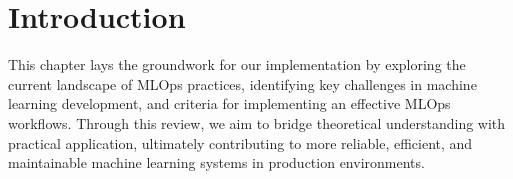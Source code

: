 \section{Introduction}\label{sec:stintro}

This chapter lays the groundwork for our implementation by exploring the current landscape of MLOps practices, identifying key challenges in machine learning development, and criteria for implementing an effective MLOps workflows.
Through this review, we aim to bridge theoretical understanding with practical application, ultimately contributing to more reliable, efficient, and maintainable machine learning systems in production environments.

